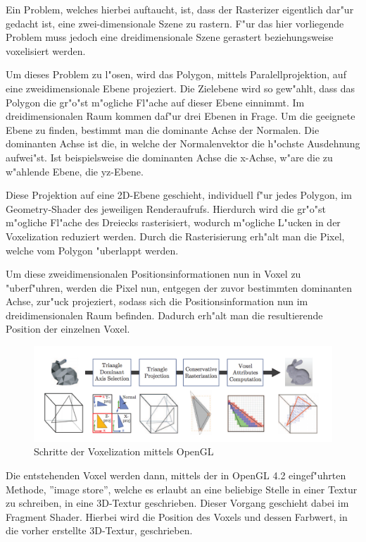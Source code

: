 \documentclass[a4paper, 12pt]{scrartcl}
\begin{document}
Ein Problem, welches hierbei auftaucht, ist, dass der Rasterizer eigentlich dar"ur gedacht ist, eine zwei-dimensionale Szene zu rastern. F"ur das hier vorliegende Problem muss jedoch eine dreidimensionale Szene gerastert beziehungsweise voxelisiert werden.

Um dieses Problem zu l"osen, wird das Polygon, mittels Paralellprojektion, auf eine zweidimensionale Ebene projeziert.
Die Zielebene wird so gew"ahlt, dass das Polygon die gr"o"st m"ogliche Fl"ache auf dieser Ebene einnimmt.
Im dreidimensionalen Raum kommen daf"ur drei Ebenen in Frage. 
Um die geeignete Ebene zu finden, bestimmt man die dominante Achse der Normalen. 
Die dominanten Achse ist die, in welche der Normalenvektor die h"ochste Ausdehnung aufwei"st.
Ist beispielsweise die dominanten Achse die x-Achse, w"are die zu w"ahlende Ebene, die yz-Ebene.

Diese Projektion auf eine 2D-Ebene geschieht, individuell f"ur jedes Polygon, im Geometry-Shader des jeweiligen Renderaufrufs.
Hierdurch wird die gr"o"st m"ogliche Fl"ache des Dreiecks rasterisiert, wodurch m"ogliche L"ucken in der Voxelization reduziert werden. Durch die Rasterisierung erh"alt man die Pixel, welche vom Polygon "uberlappt werden. 

Um diese zweidimensionalen Positionsinformationen nun in Voxel zu "uberf"uhren, werden die Pixel nun, entgegen der zuvor bestimmten dominanten Achse, zur"uck projeziert, sodass sich die Positionsinformation nun im dreidimensionalen Raum befinden. Dadurch erh"alt man die resultierende Position der einzelnen Voxel.

\begin{figure}[h]
	\centering
		\includegraphics[width=16cm]{Voxelization-Pipeline}
	\caption{Schritte der Voxelization mittels OpenGL}
\end{figure}

Die entstehenden Voxel werden dann, mittels der in OpenGL 4.2 eingef"uhrten Methode, ''image store'', welche es erlaubt an eine beliebige Stelle in einer Textur zu schreiben, in eine 3D-Textur geschrieben. Dieser Vorgang geschieht dabei im Fragment Shader. Hierbei wird die Position des Voxels und dessen Farbwert, in die vorher erstellte 3D-Textur, geschrieben.
\end{document}
